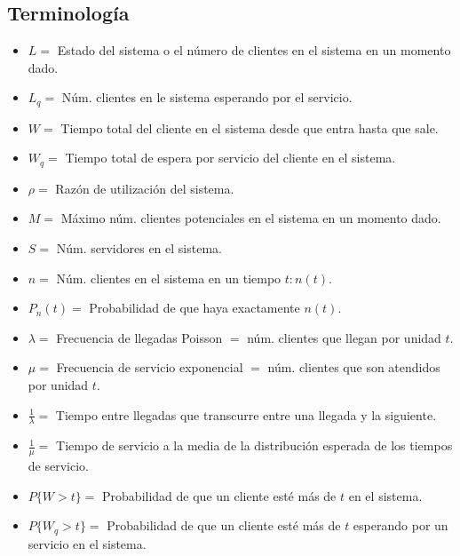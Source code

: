 \documentclass[letterpaper, 12pt]{article}
\begin{document}
\begin{justify}
    \thispagestyle{empty}
    \section*{Terminología}
    \justify
    \begin{itemize}
        \item \textbf{\(L= \)} Estado del sistema o el número de clientes en el sistema en un momento dado.
        \item \textbf{\(L_q= \)} Núm. clientes en le sistema esperando por el servicio.
        \item \textbf{\(W= \)} Tiempo total del cliente en el sistema desde que entra hasta que sale.
        \item \textbf{\(W_q= \)} Tiempo total de espera por servicio del cliente en el sistema.
        \item \textbf{\(\rho= \)} Razón de utilización del sistema.
        \item \textbf{\(M= \)} Máximo núm. clientes potenciales en el sistema en un momento dado.
        \item \textbf{\(S= \)} Núm. servidores en el sistema.
        \item \textbf{\(n= \)} Núm. clientes en el sistema en un tiempo \(t: n(t)\).
        \item \textbf{\(P_n(t)= \)} Probabilidad de que haya exactamente \(n(t)\). 
        \item \textbf{\(\lambda= \)} Frecuencia de llegadas Poisson \(=\) núm. clientes que llegan por unidad \(t\).
        \item \textbf{\(\mu= \)} Frecuencia de servicio exponencial \(=\) núm. clientes que son atendidos por unidad \(t\).
        \item \textbf{\(\frac{1}{\lambda}= \)} Tiempo entre llegadas que transcurre entre una llegada y la siguiente.
        \item \textbf{\(\frac{1}{\mu}= \)} Tiempo de servicio a la media de la distribución esperada de los tiempos de servicio.
        \item \textbf{\(P\{W>t\}= \)} Probabilidad de que un cliente  esté más de \(t\) en el sistema.
        \item \textbf{\(P\{W_q>t\}= \)} Probabilidad de que un cliente esté más de \(t\) esperando por un servicio en el sistema.
    \end{itemize}
\end{justify}    
\end{document}
